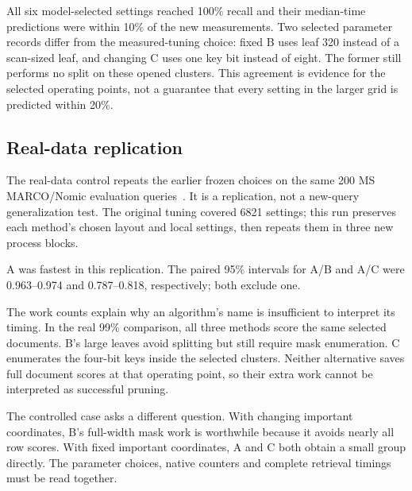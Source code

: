 \begin{table}[H]\centering\small
\caption{Frozen model choices: predicted and measured median retrieval times.}

\end{table}
All six model-selected settings reached 100\% recall and their median-time predictions were
within 10\% of the new measurements. Two selected parameter records differ from the
measured-tuning choice: fixed B uses leaf 320 instead of a scan-sized leaf, and changing C
uses one key bit instead of eight. The former still performs no split on these opened
clusters. This agreement is evidence for the selected operating points, not a guarantee
that every setting in the larger grid is predicted within 20\%.

\newpage
\subsection{Real-data replication}
The real-data control repeats the earlier frozen choices on the same 200 MS MARCO/Nomic
evaluation queries~\cite{msmarco,nomic}. It is a replication, not a new-query generalization
test. The original tuning covered 6821 settings; this run preserves each method's chosen
layout and local settings, then repeats them in three new process blocks.

\begin{table}[H]\centering\small
\caption{Replication of the frozen real-data choices at the 99\% target.}

\end{table}
\begin{table}[H]\centering\small
\caption{Mean work per query. Timing repetitions are not extra count samples.}

\end{table}

A was fastest in this replication. The paired 95\% intervals for A/B and A/C were
0.963--0.974 and 0.787--0.818, respectively; both exclude one.

The work counts explain why an algorithm's name is insufficient to interpret its timing.
In the real 99\% comparison, all three methods score the same selected documents. B's large
leaves avoid splitting but still require mask enumeration. C enumerates the four-bit keys
inside the selected clusters. Neither alternative saves full document scores at that
operating point, so their extra work cannot be interpreted as successful pruning.

The controlled case asks a different question. With changing important coordinates, B's
full-width mask work is worthwhile because it avoids nearly all row scores. With fixed
important coordinates, A and C both obtain a small group directly. The parameter choices,
native counters and complete retrieval timings must be read together.

